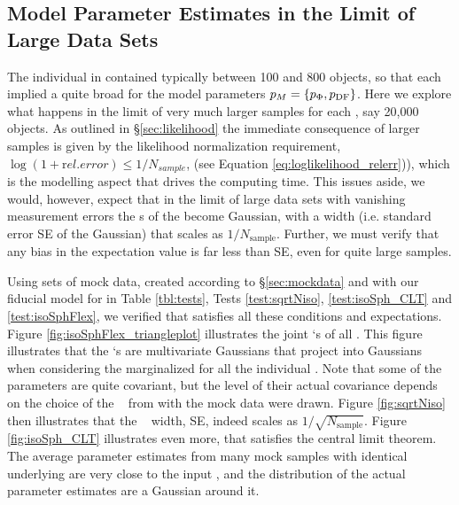 \subsection{Model Parameter Estimates in the Limit of Large Data Sets} \label{sec:largedata}

The individual \MAP in \citet{bov13} contained typically between 100 and 800 objects, so that each \MAP implied a quite broad \pdf for the model parameters $p_M=\{p_\Phi,p_\text{DF}\}$. Here we explore what happens in the limit of very much larger samples for each \MAP, say 20,000 objects. As outlined in \S\ref{sec:likelihood} the immediate consequence of larger samples is given by the likelihood normalization requirement, $\log(1+{\mathrm rel. error})\le 1/N_{sample}$, (see Equation \ref{eq:loglikelihood_relerr})), which is the modelling aspect that drives the computing time. This issues aside, we would, however, expect that in the limit of large data sets with vanishing measurement errors the \pdf s of the \pmodel become Gaussian, with a \pdf width (i.e. standard error SE of the Gaussian) that scales as $1/N_\text{sample}$. Further, we must verify that any bias in the \pdf expectation value is far less than SE, even for quite large samples.

Using sets of mock data, created according to \S\ref{sec:mockdata} and with our fiducial model for \pmodel in Table \ref{tbl:tests}, Tests \ref{test:sqrtNiso}, \ref{test:isoSph_CLT} and \ref{test:isoSphFlex}, we verified that \RM satisfies all these conditions and expectations. Figure \ref{fig:isoSphFlex_triangleplot} illustrates the joint \pdf `s of all \pmodel. This figure illustrates that the \pdf `s are multivariate Gaussians that project into Gaussians when considering the marginalized \pdf for all the individual \pmodel . Note that some of the parameters are quite covariant, but the level of their actual covariance depends on the choice of the \pmodel~ from with the mock data were drawn.  Figure \ref{fig:sqrtNiso} then illustrates that the \pdf~ width, SE, indeed scales as $1/\sqrt{N_\text{sample}}$. Figure \ref{fig:isoSph_CLT} illustrates even more, that \RM satisfies the central limit theorem. The average parameter estimates from many mock samples with identical underlying \pmodel are very close to the input \pmodel , and the distribution of the actual parameter estimates are a Gaussian around it. 



